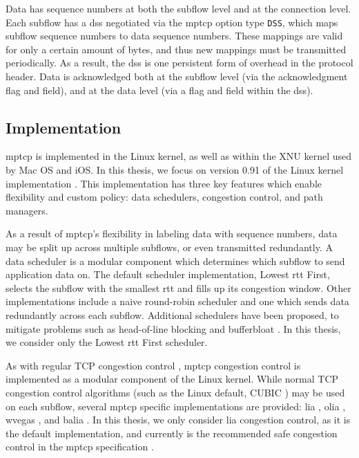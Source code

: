 \documentclass{cwru}
\begin{document}
Data has sequence numbers at both the subflow level and at the connection level.
Each subflow has a \ac{dss} negotiated via the \ac{mptcp} option type
\texttt{DSS}, which maps subflow sequence numbers to data sequence numbers.
These mappings are valid for only a certain amount of bytes, and thus new
mappings must be transmitted periodically. As a result, the \ac{dss} is one
persistent form of overhead in the protocol header. Data is acknowledged both at
the subflow level (via the acknowledgment flag and field), and at the data level
(via a flag and field within the \ac{dss}).

\subsection{Implementation}

\ac{mptcp} is implemented in the Linux kernel, as well as within the XNU kernel
used by Mac OS and iOS. In this thesis, we focus on version 0.91 of the Linux
kernel implementation \cite{mptcp}. This implementation has three key features
which enable flexibility and custom policy: data schedulers, congestion control,
and path managers.

As a result of \ac{mptcp}'s flexibility in labeling data with sequence numbers,
data may be split up across multiple subflows, or even transmitted redundantly.
A data scheduler is a modular component which determines which subflow to send
application data on. The default scheduler implementation, Lowest \ac{rtt}
First, selects the subflow with the smallest \ac{rtt} and fills up its
congestion window. Other implementations include a naive round-robin scheduler
and one which sends data redundantly across each subflow. Additional schedulers
have been proposed, to mitigate problems such as head-of-line blocking and
bufferbloat \cite{paasch2014experimental}. In this thesis, we consider only the
Lowest \ac{rtt} First scheduler.

As with regular TCP congestion control \cite{rfc5681}, \ac{mptcp} congestion
control is implemented as a modular component of the Linux kernel. While normal
TCP congestion control algorithms (such as the Linux default, CUBIC
\cite{ha2008cubic}) may be used on each subflow, several \ac{mptcp} specific
implementations are provided: \ac{lia} \cite{rfc6356}, \ac{olia}
\cite{draft-olia}, \ac{wvegas} \cite{draft-wvegas}, and \ac{balia}
\cite{draft-balia}. In this thesis, we only consider \ac{lia} congestion
control, as it is the default implementation, and currently is the recommended
safe congestion control in the \ac{mptcp} specification \cite{rfc6824}.
\end{document}
